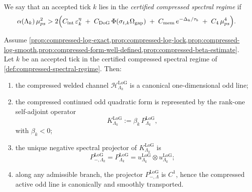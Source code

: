 \documentclass[11pt]{article}
\begin{document}
\begin{definition}
\label{def:compressed-spectral-regime}
We say that an accepted tick \(k\) lies in the \emph{certified compressed spectral regime} if
\begin{equation}
\alpha(\Lambda_k)\,\mu_{ps}^2
>
2\Big(
C_{\rm int}\,\varepsilon_k^{\eta}
\;+\;
C_{\rm DoG}\,\Phi(\sigma_{t,k}\Omega_{\rm gap})
\;+\;
C_{\rm mem}\,e^{-\Delta_k/\tau_b}
\;+\;
C_4\,\mu_{ps}^4
\Big).
\label{eq:compressed-certified}
\end{equation}
\end{definition}

\begin{theorem}
\label{thm:finite-cutoff-canonical-odd-spectral-selection}
Assume
\cref{prop:compressed-log-exact,prop:compressed-log-lock,prop:compressed-log-smooth,prop:compressed-form-well-defined,prop:compressed-beta-estimate}.
Let \(k\) be an accepted tick in the certified compressed spectral regime of
\cref{def:compressed-spectral-regime}. Then:
\begin{enumerate}[leftmargin=2em]
\item the compressed welded channel \(\mathcal H^{\mathrm{LoG}}_{\Lambda_k}\) is a canonical
one-dimensional odd line;
\item the compressed continued odd quadratic form is represented by the rank-one self-adjoint operator
\begin{equation}
K^{\mathrm{LoG}}_{\Lambda_k}
:=
\beta_k\,P^{\mathrm{LoG}}_{\Lambda_k},
\label{eq:Klog-def}
\end{equation}
with \(\beta_k<0\);
\item the unique negative spectral projector of \(K^{\mathrm{LoG}}_{\Lambda_k}\) is
\begin{equation}
P_{-,\Lambda_k}^{\mathrm{LoG}}
=
P^{\mathrm{LoG}}_{\Lambda_k}
=
u^{\mathrm{LoG}}_{\Lambda_k}\otimes u^{\mathrm{LoG}}_{\Lambda_k};
\label{eq:Pminus-log}
\end{equation}
\item along any admissible branch, the projector \(P_{-,\Lambda}^{\mathrm{LoG}}\) is \(C^1\), hence
the compressed active odd line is canonically and smoothly transported.
\end{enumerate}
\end{theorem}
\end{document}
